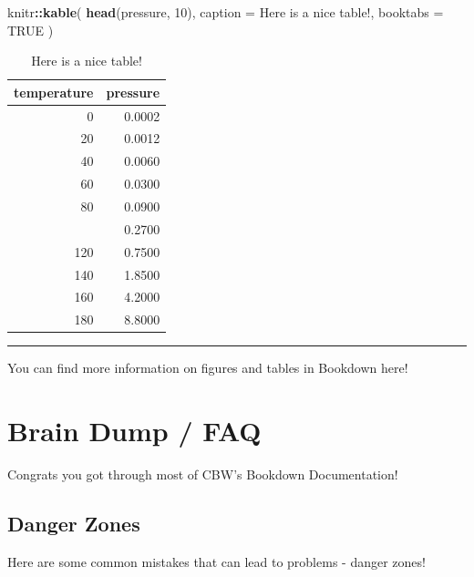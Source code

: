 \documentclass[
]{book}
\newenvironment{Shaded}{\begin{snugshade}}{\end{snugshade}}
\newcommand{\AttributeTok}[1]{\textcolor[rgb]{0.13,0.29,0.53}{#1}}
\newcommand{\ConstantTok}[1]{\textcolor[rgb]{0.56,0.35,0.01}{#1}}
\newcommand{\DecValTok}[1]{\textcolor[rgb]{0.00,0.00,0.81}{#1}}
\newcommand{\FunctionTok}[1]{\textcolor[rgb]{0.13,0.29,0.53}{\textbf{#1}}}
\newcommand{\NormalTok}[1]{#1}
\newcommand{\SpecialCharTok}[1]{\textcolor[rgb]{0.81,0.36,0.00}{\textbf{#1}}}
\newcommand{\StringTok}[1]{\textcolor[rgb]{0.31,0.60,0.02}{#1}}
\theoremstyle{definition}
\theoremstyle{definition}
\theoremstyle{definition}
\theoremstyle{definition}
\theoremstyle{remark}
\begin{document}
\begin{Shaded}
\begin{Highlighting}[]
\NormalTok{knitr}\SpecialCharTok{::}\FunctionTok{kable}\NormalTok{(}
  \FunctionTok{head}\NormalTok{(pressure, }\DecValTok{10}\NormalTok{), }\AttributeTok{caption =} \StringTok{\textquotesingle{}Here is a nice table!\textquotesingle{}}\NormalTok{,}
  \AttributeTok{booktabs =} \ConstantTok{TRUE}
\NormalTok{)}
\end{Highlighting}
\end{Shaded}

\begin{table}

\caption{\label{tab:nice-tab}Here is a nice table!}
\centering
\begin{tabular}[t]{rr}
\toprule
temperature & pressure\\
\midrule
0 & 0.0002\\
20 & 0.0012\\
40 & 0.0060\\
60 & 0.0300\\
80 & 0.0900\\
\addlinespace
100 & 0.2700\\
120 & 0.7500\\
140 & 1.8500\\
160 & 4.2000\\
180 & 8.8000\\
\bottomrule
\end{tabular}
\end{table}

\begin{center}\rule{0.5\linewidth}{0.5pt}\end{center}

You can find more information on figures and tables in Bookdown here!

\chapter{Brain Dump / FAQ}\label{help}

Congrats you got through most of CBW's Bookdown Documentation!

\section{Danger Zones}\label{danger-zones}

Here are some common mistakes that can lead to problems - danger zones!
\end{document}
